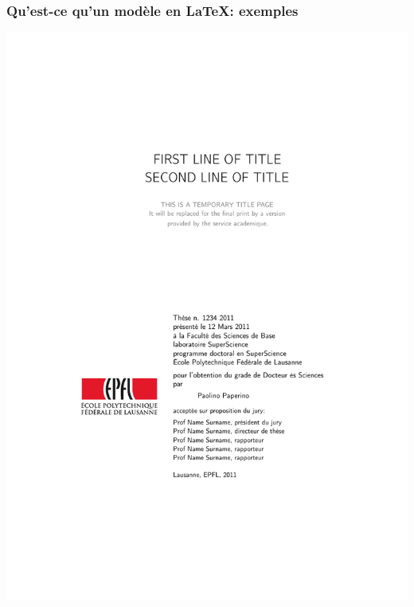 \documentclass{clic_latex_beamer}
\begin{document}
 \begin{frame}
\frametitle{Qu'est-ce qu'un modèle en \LaTeX: exemples}
\centering
\includegraphics[height=\textheight]{illustrations/macros/thesis_exemple.pdf}
 \end{frame}
 
\end{document}
